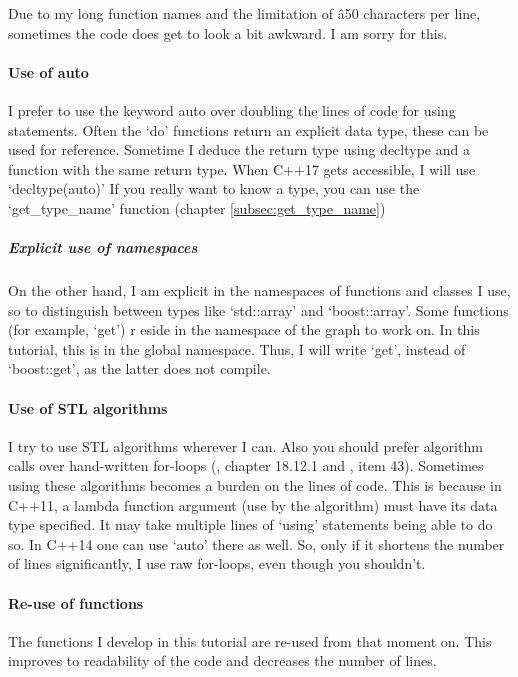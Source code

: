 Due to my long function names and the limitation of â50 characters per line,
sometimes the code does get to look a bit awkward.
I am sorry for this.

\paragraph{Use of auto}

I prefer to use the keyword auto over doubling the lines of code for using
statements.
Often the `do' functions return an explicit data type, these can be used
for reference.
Sometime I deduce the return type using decltype and a function with the
same return type.
When C++17 gets accessible, I will use `decltype(auto)'
If you really want to know a type, you can use the `get_type_name' function
(chapter \ref{subsec:get_type_name})

\subparagraph{Explicit use of namespaces}

On the other hand, I am explicit in the namespaces of functions and classes
I use, so to distinguish between types like `std::array' and `boost::array'.
Some functions (for example, `get') r
eside in the namespace of the graph to work on.
In this tutorial, this is in the global namespace.
Thus, I will write `get', instead of `boost::get', 
as the latter does not compile.

\paragraph{Use of STL algorithms}

I try to use STL algorithms wherever I can.
Also you should prefer algorithm calls over hand-written 
for-loops (\cite{stroustrup1997}, chapter 18.12.1 and \cite{meyers2005effective}, item 43).
Sometimes using these algorithms becomes a burden on the lines of code.
This is because in C++11, a lambda function argument (use by the algorithm)
must have its data type specified.
It may take multiple lines of `using' statements being able to do so.
In C++14 one can use `auto' there as well.
So, only if it shortens the number of lines significantly, I use raw for-loops,
even though you shouldn't.

\paragraph{Re-use of functions}

The functions I develop in this tutorial are re-used from that moment on.
This improves to readability of the code and decreases the number of lines.

